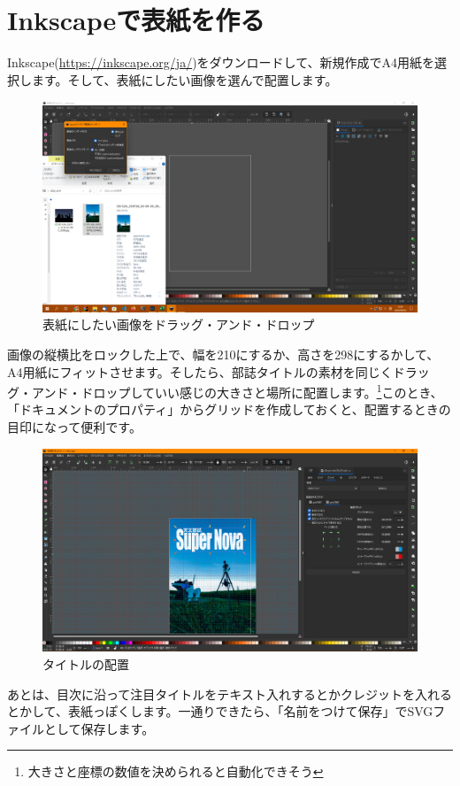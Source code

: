 \documentclass[../main]{subfiles}
\begin{document}
\section{Inkscapeで表紙を作る}
Inkscape(\url{https://inkscape.org/ja/})をダウンロードして、新規作成でA4用紙を選択します。そして、表紙にしたい画像を選んで配置します。
\begin{figure}[H]
  \centering
  \includegraphics[width=.5\textwidth]{figures/ss265.png}
  \caption{表紙にしたい画像をドラッグ・アンド・ドロップ}
  \label{fig:ss265}
\end{figure}
画像の縦横比をロックした上で、幅を210にするか、高さを298にするかして、A4用紙にフィットさせます。そしたら、部誌タイトルの素材を同じくドラッグ・アンド・ドロップしていい感じの大きさと場所に配置します。\footnote{大きさと座標の数値を決められると自動化できそう}このとき、「ドキュメントのプロパティ」からグリッドを作成しておくと、配置するときの目印になって便利です。
\begin{figure}[H]
  \centering
  \includegraphics[width=.5\textwidth]{figures/ss267.png}
  \caption{タイトルの配置}
  \label{fig:ss267}
\end{figure}
あとは、目次に沿って注目タイトルをテキスト入れするとかクレジットを入れるとかして、表紙っぽくします。一通りできたら、「名前をつけて保存」でSVGファイルとして保存します。
\end{document}
